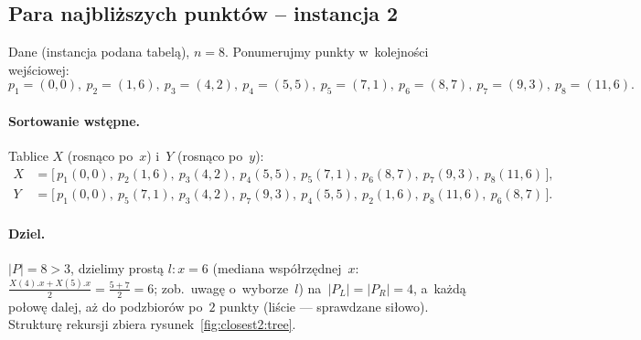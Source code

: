 \subsection{Para najbliższych punktów -- instancja 2}


Dane (instancja podana tabelą), $n = 8$. Ponumerujmy punkty w~kolejności
wejściowej:
\[
	p_1=(0,0),\ p_2=(1,6),\ p_3=(4,2),\ p_4=(5,5),\
	p_5=(7,1),\ p_6=(8,7),\ p_7=(9,3),\ p_8=(11,6).
\]

\paragraph{Sortowanie wstępne.}
Tablice $X$ (rosnąco po~$x$) i~$Y$ (rosnąco po~$y$):
\begin{align*}
	X &= \big[\,p_1(0,0),\ p_2(1,6),\ p_3(4,2),\ p_4(5,5),\ p_5(7,1),\ p_6(8,7),\ p_7(9,3),\ p_8(11,6)\,\big], \\
	Y &= \big[\,p_1(0,0),\ p_5(7,1),\ p_3(4,2),\ p_7(9,3),\ p_4(5,5),\ p_2(1,6),\ p_8(11,6),\ p_6(8,7)\,\big].
\end{align*}

\paragraph{Dziel.}
$|P|=8>3$, dzielimy prostą $l\colon x=6$ (mediana współrzędnej~$x$:
$\frac{X(4).x + X(5).x}{2} = \frac{5+7}{2} = 6$; zob.~uwagę o~wyborze~$l$)
na~$|P_L|=|P_R|=4$, a~każdą połowę dalej,
aż do podzbiorów po~$2$ punkty (liście --- sprawdzane siłowo). Strukturę rekursji
zbiera rysunek~\ref{fig:closest2:tree}.

\begin{azfigure}
	\centering
	\caption{Drzewo rekursji. Cztery liście (po~2 punkty) liczone są siłowo;
		ich kolory powtarzają się na~rysunku~\ref{fig:closest2:result}.}
	\label{fig:closest2:tree}
\end{azfigure}

